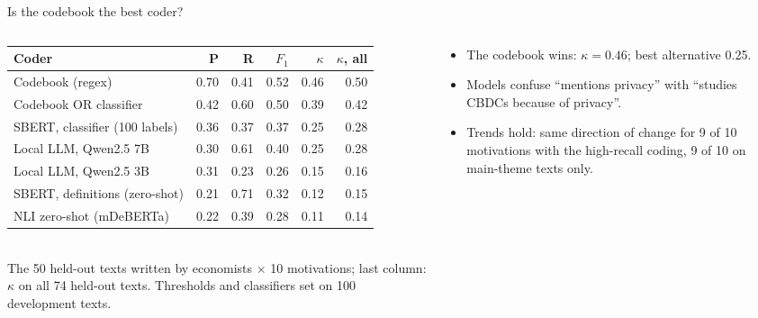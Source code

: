 \documentclass[aspectratio=169,10pt]{beamer}
\begin{document}
\begin{frame}{Is the codebook the best coder?}
\begin{columns}[T]
\begin{column}{0.58\textwidth}\scriptsize
\begin{tabular}{@{}lrrrrr@{}}\toprule
\textbf{Coder} & \textbf{P} & \textbf{R} & $F_1$ & $\kappa$ & $\kappa$\textbf{, all}\\\midrule
\rowcolor{c4!12}Codebook (regex) & 0.70 & 0.41 & 0.52 & 0.46 & 0.50 \\
Codebook OR classifier & 0.42 & 0.60 & 0.50 & 0.39 & 0.42 \\
SBERT, classifier (100 labels) & 0.36 & 0.37 & 0.37 & 0.25 & 0.28 \\
Local LLM, Qwen2.5 7B & 0.30 & 0.61 & 0.40 & 0.25 & 0.28 \\
Local LLM, Qwen2.5 3B & 0.31 & 0.23 & 0.26 & 0.15 & 0.16 \\
SBERT, definitions (zero-shot) & 0.21 & 0.71 & 0.32 & 0.12 & 0.15 \\
NLI zero-shot (mDeBERTa) & 0.22 & 0.39 & 0.28 & 0.11 & 0.14 \\
\bottomrule\end{tabular}\\[3pt]
The 50 held-out texts written by economists $\times$ 10 motivations; last column: $\kappa$ on all 74 held-out texts. Thresholds and classifiers set on 100 development texts.
\end{column}
\begin{column}{0.4\textwidth}\small
\begin{itemize}\setlength\itemsep{2pt}
\item \alert{The codebook wins}: $\kappa = 0.46$; best alternative 0.25.
\item Models confuse ``mentions privacy'' with ``studies CBDCs because of privacy''.
\item Trends hold: same direction of change for 9 of 10 motivations with the high-recall coding, 9 of 10 on main-theme texts only.

\end{itemize}
\end{column}
\end{columns}
\end{frame}
\end{document}
